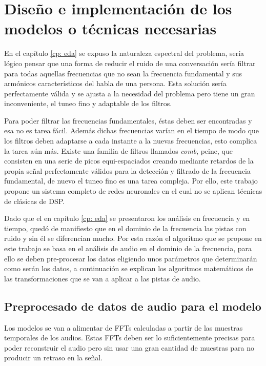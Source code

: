 \chapter{Diseño e implementación de los modelos o técnicas necesarias}\label{cp: modelDesign}
En el capítulo \ref{cp: eda} se expuso la naturaleza espectral del problema, sería lógico pensar que una forma de reducir el ruido de una conversación sería filtrar para todas aquellas frecuencias que no sean la frecuencia fundamental y sus armónicos característicos del habla de una persona. Esta solución sería perfectamente válida y se ajusta a la necesidad del problema pero tiene un gran inconveniente, el tuneo fino y adaptable de los filtros.

Para poder filtrar las frecuencias fundamentales, éstas deben ser encontradas y esa no es tarea fácil. Además dichas frecuencias varían en el tiempo de modo que los filtros deben adaptarse a cada instante a la nuevas frecuencias, esto complica la tarea aún más. Existe una familia de filtros llamados \textit{comb}, peine, que consisten en una serie de picos equi-espaciados creando mediante retardos de la propia señal perfectamente válidos para la detección y filtrado de la frecuencia fundamental\cite{1035730}, de nuevo el tuneo fino es una tarea compleja. Por ello, este trabajo propone un sistema completo de redes neuronales en el cual no se aplican técnicas de clásicas de \gls{DSP}.

Dado que el en capítulo \ref{cp: eda} se presentaron los análisis en frecuencia y en tiempo, quedó de manifiesto que en el dominio de la frecuencia las pistas con ruido y sin él se diferencian mucho. Por esta razón el algoritmo que se propone en este trabajo se basa en el análisis de audio en el dominio de la frecuencia, para ello se deben pre-procesar los datos eligiendo unos parámetros que determinarán como serán los datos, a continuación se explican los algoritmos matemáticos de las transformaciones que se van a aplicar a las pistas de audio.

\section{Preprocesado de datos de audio para el modelo}
Los modelos se van a alimentar de \glspl{FFT} calculadas a partir de las muestras temporales de los audios. Estas \glspl{FFT} deben ser lo suficientemente precisas para poder reconstruir el audio pero sin usar una gran cantidad de muestras para no producir un retraso en la señal.

